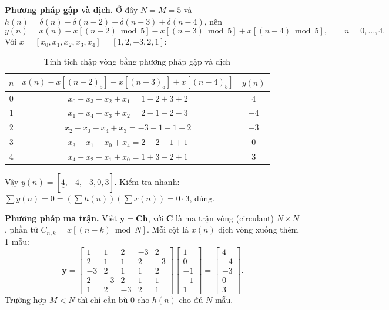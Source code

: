 \documentclass[12pt,a4paper]{article}
\newcommand{\org}[1]{\underset{\uparrow}{#1}}
\begin{document}
\textbf{Phương pháp gập và dịch.} Ở đây $N = M = 5$ và $h(n) = \delta(n) - \delta(n-2) - \delta(n-3) + \delta(n-4)$, nên
\[
    y(n) = x(n) - x[(n-2) \bmod 5] - x[(n-3) \bmod 5] + x[(n-4) \bmod 5], \qquad n = 0, \dots, 4.
\]
Với $x = [x_0, x_1, x_2, x_3, x_4] = [1, 2, -3, 2, 1]$:
\begin{table}[H]
\centering
\begin{tabular}{c|c|c}
\toprule
$n$ & $x(n) - x[(n-2)_5] - x[(n-3)_5] + x[(n-4)_5]$ & $y(n)$ \\
\midrule
0 & $x_0 - x_3 - x_2 + x_1 = 1 - 2 + 3 + 2$ & $4$ \\
1 & $x_1 - x_4 - x_3 + x_2 = 2 - 1 - 2 - 3$ & $-4$ \\
2 & $x_2 - x_0 - x_4 + x_3 = -3 - 1 - 1 + 2$ & $-3$ \\
3 & $x_3 - x_1 - x_0 + x_4 = 2 - 2 - 1 + 1$ & $0$ \\
4 & $x_4 - x_2 - x_1 + x_0 = 1 + 3 - 2 + 1$ & $3$ \\
\bottomrule
\end{tabular}
\caption{Tính tích chập vòng bằng phương pháp gập và dịch}
\end{table}
\noindent Vậy $y(n) = [\org{4}, -4, -3, 0, 3]$. Kiểm tra nhanh: $\sum y(n) = 0 = \left(\sum h(n)\right)\left(\sum x(n)\right) = 0 \cdot 3$, đúng.

\textbf{Phương pháp ma trận.} Viết $\mathbf{y} = \mathbf{C}\mathbf{h}$, với $\mathbf{C}$ là ma trận vòng (circulant) $N \times N$, phần tử $C_{n,k} = x[(n-k) \bmod N]$. Mỗi cột là $x(n)$ dịch vòng xuống thêm 1 mẫu:
\[
    \mathbf{y} =
    \begin{bmatrix}
         1 &  1 &  2 & -3 &  2 \\
         2 &  1 &  1 &  2 & -3 \\
        -3 &  2 &  1 &  1 &  2 \\
         2 & -3 &  2 &  1 &  1 \\
         1 &  2 & -3 &  2 &  1
    \end{bmatrix}
    \begin{bmatrix} 1 \\ 0 \\ -1 \\ -1 \\ 1 \end{bmatrix}
    =
    \begin{bmatrix} 4 \\ -4 \\ -3 \\ 0 \\ 3 \end{bmatrix}.
\]
Trường hợp $M < N$ thì chỉ cần bù 0 cho $h(n)$ cho đủ $N$ mẫu.
\end{document}
